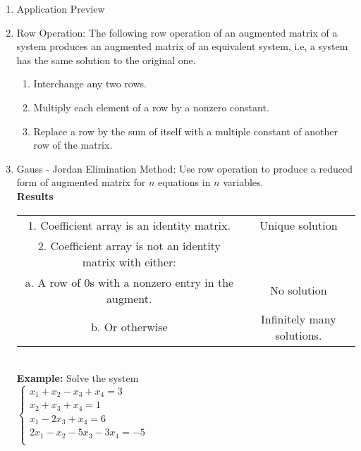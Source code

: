 \documentclass[12pt]{amsart}
\begin{document}
\begin{enumerate}

\item Application Preview 


\item Row Operation: The following row operation of an augmented matrix of a system produces an augmented matrix of an equivalent system, i.e, a system has the same solution to the original one. \\

\begin{enumerate}
 \item Interchange any two rows.
 
 \item Multiply each element of a row by a nonzero constant.
 
 \item Replace a row by the sum of itself with a multiple constant of another row of the matrix. 

\end{enumerate}

\item Gauss - Jordan Elimination Method: Use row operation to produce a reduced form of augmented matrix for $n$ equations in $n$ variables. \\

\textbf{Results}\\

\begin{tabular}{|c|c|}

\hline 
1. Coefficient array is an identity matrix. & Unique solution \\
 2. Coefficient array is not an identity matrix with either:  & \\
 a. A row of 0s with a nonzero entry in the augment. & No solution\\
 b. Or otherwise & Infinitely many solutions.\\
 \hline
\end{tabular} \\

\textbf{Example:} Solve the system \\

$\begin{cases}
x_1 + x_2 - x_3 + x_4 = 3 \\
x_2 + x_3 + x_4 = 1\\
x_1 - 2x_3 + x_4 = 6 \\
2x_1 -x_2 -5x_3 -3x_4 = -5 \\
\end{cases} $


\end{enumerate}
\end{document}

